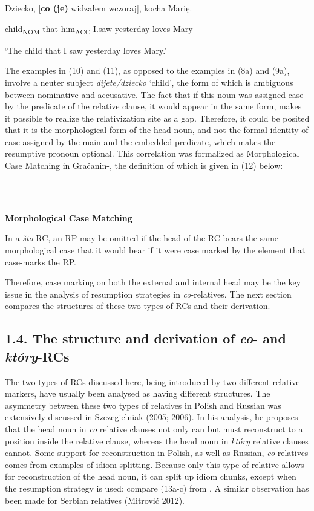 \documentclass[output=paper]{langsci/langscibook}
\begin{document}
          Dziecko, [\textbf{co (je)}   widzałem   wczoraj],   kocha   Marię.

  child\textsubscript{NOM} that him\textsubscript{ACC}  I.saw   yesterday   loves   Mary

  ‘The child that I saw yesterday loves Mary.’

The examples in (10) and (11), as opposed to the examples in (8a) and (9a), involve a neuter subject \textit{dijete/dziecko} ‘child’, the form of which is ambiguous between nominative and accusative. The fact that if this noun was assigned case by the predicate of the relative clause, it would appear in the same form, makes it possible to realize the relativization site as a gap. Therefore, it could be posited that it is the morphological form of the head noun, and not the formal identity of case assigned by the main and the embedded predicate, which makes the resumptive pronoun optional. This correlation was formalized as Morphological Case Matching in Gračanin-\citet[30]{Yuksek2013}, the definition of which is given in (12) below: 

\ea%
    \label{ex:key:12}
    \gll\\
        \\
    \glt
    \z

          \textbf{Morphological Case Matching}

In a \textit{što}{}-RC, an RP may be omitted if the head of the RC bears the same morphological case that it would bear if it were case marked by the element that case-marks the RP.

Therefore, case marking on both the external and internal head may be the key issue in the analysis of resumption strategies in \textit{co}{}-relatives. The next section compares the structures of these two types of RCs and their derivation.

\subsection{ 1.4. The structure and derivation of \textit{co}{}- and \textit{który}{}-RCs} 

The two types of RCs discussed here, being introduced by two different relative markers, have usually been analysed as having different structures. The asymmetry between these two types of relatives in Polish and Russian was extensively discussed in Szczegielniak (2005; 2006). In his analysis, he proposes that the head noun in \textit{co} relative clauses not only can but must reconstruct to a position inside the relative clause, whereas the head noun in \textit{który} relative clauses cannot. Some support for reconstruction in Polish, as well as Russian, \textit{co}{}-relatives comes from examples of idiom splitting. Because only this type of relative allows for reconstruction of the head noun, it can split up idiom chunks, except when the resumption strategy is used; compare (13a-c) from \citet[377]{Szczegielniak2006}. A similar observation has been made for Serbian relatives (Mitrović 2012).
\end{document}
